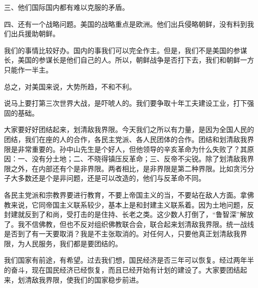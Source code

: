 三、他们国际国内都有难以克服的矛盾。

四、还有一个战略问题。美国的战略重点是欧洲。他们出兵侵略朝鲜，没有料到我们出兵援助朝鲜。

我们的事情比较好办。国内的事我们可以完全作主。但是，我们不是美国的参谋长，美国的参谋长是他们自己的人。所以，朝鲜战争是否打下去，我们和朝鲜一方只能作一半主。

总之，对美国来说，大势所趋，不和不利。

说马上要打第三次世界大战，是吓唬人的。我们要争取十年工夫建设工业，打下强固的基础。

大家要好好团结起来，划清敌我界限。今天我们之所以有力量，是因为全国人民的团结，我们在座的人的合作，各民主党派、各人民团体的合作。团结和划清敌我界限是非常重要的。孙中山先生是个好人，但他领导的辛亥革命为什么失败了？其原因：一、没有分土地；二、不晓得镇压反革命；三、反帝不尖锐。除了划清敌我界限之外，在内部还有个是非界限。两者相比，是非界限是第二种界限。比如贪污分子大多数还是个是非问题，还是可以改造的，他们与反革命不同。

各民主党派和宗教界要进行教育，不要上帝国主义的当，不要站在敌人方面。拿佛教来说，它同帝国主义联系较少，基本上是和封建主义联系着。因为土地问题，反封建就反到了和尚，受打击的是住持、长老之类。这少数人打倒了，“鲁智深”解放了。我不信佛教，但也不反对组织佛教联合会，联合起来划清敌我界限。统一战线是否到了有一天要取消？我是不主张取消的。对任何人，只要他真正划清敌我界限，为人民服务，我们都是要团结的。

我们国家有前途，有希望。过去我们想，国民经济是否三年可以恢复。经过两年半的奋斗，现在国民经济已经恢复，而且已经开始有计划的建设了。大家要团结起来，划清敌我界限，使我们的国家稳步前进。
